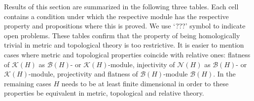 Results of this section are summarized in the following three tables. Each cell
contains a condition under which the respective module has the respective
property and propositions where this is proved. We use `???' symbol to indicate
open problems. These tables confirm that the property of being homologically
trivial in metric and topological theory is too restrictive. It is easier to
mention cases where metric and topological properties coincide with relative
ones: flatness of $\mathcal{K}(H)$ as $\mathcal{B}(H)$- or
$\mathcal{K}(H)$-module, injectivity of $\mathcal{N}(H)$ as $\mathcal{B}(H)$- or
$\mathcal{K}(H)$-module, projectivity and flatness of $\mathcal{B}(H)$-module
$\mathcal{B}(H)$. In the remaining cases $H$ needs to be at least finite
dimensional in order to these properties be equivalent in metric, topological
and relative theory.


